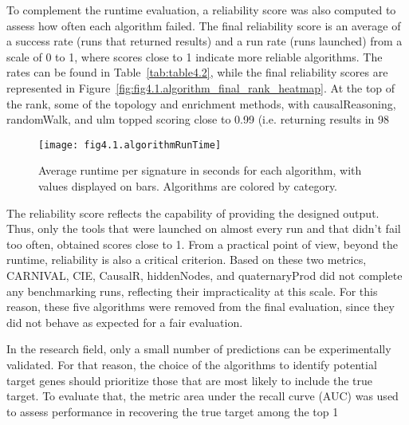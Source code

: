 To complement the runtime evaluation, a reliability score was also computed to assess how often each algorithm failed. The final reliability score is an average of a success rate (runs that returned results) and a run rate (runs launched) from a scale of 0 to 1, where scores close to 1 indicate more reliable algorithms. The rates can be found in Table~\ref{tab:table4.2}, while the final reliability scores are represented in Figure~\ref{fig:fig4.1.algorithm_final_rank_heatmap}. At the top of the rank, some of the topology and enrichment methods, with  causalReasoning, randomWalk, and ulm topped scoring close to 0.99 (i.e. returning results in 98%

\begin{figure}[htbp]
    \centering
    \texttt{[image: fig4.1.algorithmRunTime]}
    \caption[Runtime per signtures.]{Average runtime per signature in seconds for each algorithm, with values displayed on bars. Algorithms are colored by category.}
    \label{fig:fig4.1.algorithmRunTime}
\end{figure}

The reliability score reflects the capability of providing the designed output. Thus, only the tools that were launched on almost every run and that didn't fail too often, obtained scores close to 1. From a practical point of view, beyond the runtime, reliability is also a critical criterion. Based on these two metrics, CARNIVAL, CIE, CausalR, hiddenNodes, and quaternaryProd did not complete any benchmarking runs, reflecting their impracticality at this scale. For this reason, these five algorithms were removed from the final evaluation, since they did not behave as expected for a fair evaluation. 

In the research field, only a small number of predictions can be experimentally validated. For that reason, the choice of the algorithms to identify potential target genes should prioritize those that are most likely to include the true target. To evaluate that, the metric area under the recall curve (AUC) was used to assess performance in recovering the true target among the top 1%


